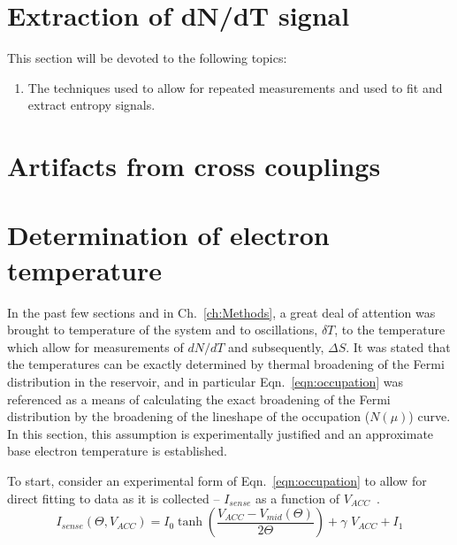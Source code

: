 \section{Extraction of dN/dT signal}
\label{sec:data_analysis}
This section will be devoted to the following topics:
\begin{enumerate}
	\item The techniques used to allow for repeated measurements and used to fit and extract entropy signals.
\end{enumerate}


\section{Artifacts from cross couplings}
\label{sec:artifacts}

\begin{figure}[h]
\centering
{}
\caption{}
\label{fig:dndt_artifact}       
\end{figure}


\section{Determination of electron temperature}
\label{sec:electrontemp}

In the past few sections and in Ch.~\ref{ch:Methods}, a great deal of attention was brought to temperature of the system and to oscillations, $\delta T$, to the temperature which allow for measurements of $dN/dT$ and subsequently, $\Delta S$. It was stated that the temperatures can be exactly determined by thermal broadening of the Fermi distribution in the reservoir, and in particular Eqn.~\ref{eqn:occupation} was referenced as a means of calculating the exact broadening of the Fermi distribution by the broadening of the lineshape of the occupation ($N(\mu)$) curve. In this section, this assumption is experimentally justified and an approximate base electron temperature is established. 

To start, consider an experimental form of Eqn.~\ref{eqn:occupation} to allow for direct fitting to data as it is collected -- $I_{sense}$ as a function of $V_{ACC}$~\cite{nikentropy}.
\begin{equation}
	\label{eqn:exp_isense}
	 I_{sense}(\Theta, V_{ACC}) = I_0 \tanh\left(\frac{V_{ACC} - V_{mid}(\Theta)}{2\Theta}\right) + \gamma \,\, V_{ACC} + I_1
\end{equation}


